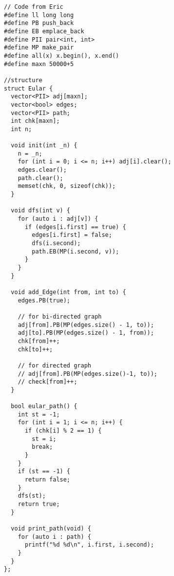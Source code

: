 \begin{lstlisting}
// Code from Eric
#define ll long long
#define PB push_back
#define EB emplace_back
#define PII pair<int, int>
#define MP make_pair
#define all(x) x.begin(), x.end()
#define maxn 50000+5
  
//structure
struct Eular {
  vector<PII> adj[maxn];
  vector<bool> edges;
  vector<PII> path;
  int chk[maxn];
  int n;

  void init(int _n) {
    n = _n;
    for (int i = 0; i <= n; i++) adj[i].clear();
    edges.clear();
    path.clear();
    memset(chk, 0, sizeof(chk));
  }

  void dfs(int v) {
    for (auto i : adj[v]) {
      if (edges[i.first] == true) {
        edges[i.first] = false;
        dfs(i.second);
        path.EB(MP(i.second, v));
      }
    }
  }

  void add_Edge(int from, int to) {
    edges.PB(true);

    // for bi-directed graph
    adj[from].PB(MP(edges.size() - 1, to));
    adj[to].PB(MP(edges.size() - 1, from));
    chk[from]++;
    chk[to]++;

    // for directed graph
    // adj[from].PB(MP(edges.size()-1, to));
    // check[from]++;
  }

  bool eular_path() {
    int st = -1;
    for (int i = 1; i <= n; i++) {
      if (chk[i] % 2 == 1) {
        st = i;
        break;
      }
    }
    if (st == -1) {
      return false;
    }
    dfs(st);
    return true;
  }

  void print_path(void) {
    for (auto i : path) {
      printf("%d %d\n", i.first, i.second);
    }
  }
};
\end{lstlisting}

